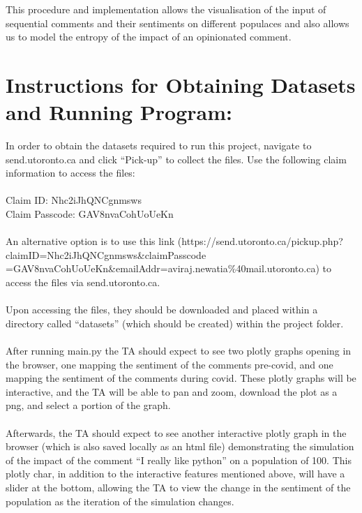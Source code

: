\documentclass[fontsize=11pt]{article}
\begin{document}
This procedure and implementation allows the visualisation of the input of sequential comments and their sentiments on different populaces and also allows us to model the entropy of the impact of an opinionated comment.

\section*{Instructions for Obtaining Datasets and Running Program:}
In order to obtain the datasets required to run this project, navigate to send.utoronto.ca and click “Pick-up” to collect the files. Use the following claim information to access the files: \\\\
Claim ID: Nhc2iJhQNCgnmsws \\
Claim Passcode: GAV8nvaCohUoUeKn \\\\
An alternative option is to use this link (https://send.utoronto.ca/pickup.php?claimID=Nhc2iJhQNCgnmsws\&claimPasscode\\=GAV8nvaCohUoUeKn\&emailAddr=aviraj.newatia\%40mail.utoronto.ca) to access the files via send.utoronto.ca. \\\\
Upon accessing the files, they should be downloaded and placed within a directory called “datasets” (which should be created) within the project folder.\\\\
After running main.py the TA should expect to see two plotly graphs opening in the browser, one mapping the sentiment of the comments pre-covid, and one mapping the sentiment of the comments during covid. These plotly graphs will be interactive, and the TA will be able to pan and zoom, download the plot as a png, and select a portion of the graph.\\\\
Afterwards, the TA should expect to see another interactive plotly graph in the browser (which is also saved locally as an html file) demonstrating the simulation of the impact of the comment “I really like python” on a population of 100. This plotly char, in addition to the interactive features mentioned above, will have a slider at the bottom, allowing the TA to view the change in the sentiment of the population as the iteration of the simulation changes.
\end{document}
